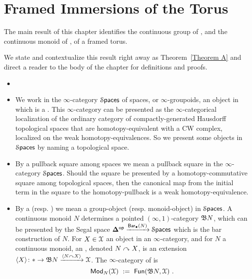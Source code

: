 \chapter{Framed Immersions of the Torus}\label{CH:F}

The main result of this chapter identifies the continuous group of , and the continuous monoid of , of a framed torus.


We state and contextualize this result right away as Theorem~\ref{Theorem A} and direct a reader to the body of the chapter for definitions and proofs.  





\begin{conventions*}
{\small
\begin{itemize}
\item[~]

\item
We work in the $\infty$-category $\operatorname{\mathcal S\mathsf{paces}}$ of spaces, or $\infty$-groupoids, an object in which is a .  
This $\infty$-category can be presented as the $\infty$-categorical localization of the ordinary category of compactly-generated Hausdorff topological spaces that are homotopy-equivalent with a CW complex, localized on the weak homotopy-equivalences.  
So we present some objects in $\operatorname{\mathcal S\mathsf{paces}}$ by naming a topological space.  

\item
By a pullback square among spaces we mean a pullback square in the $\infty$-category $\operatorname{\mathcal S\mathsf{paces}}$.
Should the square be presented by a homotopy-commutative square among topological spaces, then the canonical map from the initial term in the square to the homotopy-pullback is a weak homotopy-equivalence.  

\item
By a  (resp. ) we mean a group-object (resp. monoid-object) in $\operatorname{\mathcal S\mathsf{paces}}$.
A continuous monoid $N$ determines a pointed $(\infty,1)$-category $\mathfrak B N$, which can be presented by the Segal space $\mathbf\Delta^{\operatorname{\mathsf{op}}}\xrightarrow{\operatorname{\sf Bar}_\bullet(N)}\operatorname{\mathcal S\mathsf{paces}}$ which is the bar construction of $N$.
For $X \in \mathcal X$ an object in an $\infty$-category, and for $N$ a continuous monoid, 
an , denoted $N \curvearrowright X$, is an extension
$
\langle X \rangle 
\colon 
\ast 
\to 
\mathfrak B N
\xrightarrow{ \langle N \curvearrowright X \rangle}
\mathcal X
$.
The $\infty$-category of  is
\[
\operatorname{\sf Mod}_N(\mathcal X)
~:=~
\operatorname{{\sf Fun}}( \mathfrak B N , \mathcal X)
~.
\]


\end{itemize}}
\end{conventions*}
